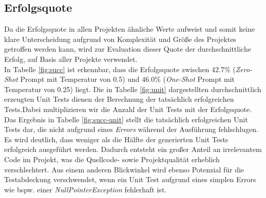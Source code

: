 \subsection{Erfolgsquote}
Da die Erfolgsquote in allen Projekten ähnliche Werte aufweist und somit keine klare Unterscheidung aufgrund von Komplexität und Größe des Projektes getroffen werden kann, wird zur Evaluation dieser Quote der durchschnittliche Erfolg, auf Basis aller Projekte verwendet.\\
In Tabelle \ref{fig:succ} ist erkennbar, dass die Erfolgsquote zwischen 42.7\% (\textit{Zero-Shot} Prompt mit Temperatur von 0.5) und 46.0\% (\textit{One-Shot} Prompt mit Temperatur von 0.25) liegt. Die in Tabelle \ref{fig:unit} dargestellten durchschnittlich erzeugten Unit Tests dienen der Berechnung der tatsächlich erfolgreichen Tests.Dabei multiplizieren wir die Anzahl der Unit Tests mit der Erfolgsquote. Das Ergebnis in Tabelle \ref{fig:succ-unit} stellt die tatsächlich erfolgreichen Unit Tests dar, die nicht aufgrund eines \textit{Errors} während der Ausführung fehlschlugen.  Es wird deutlich, dass weniger als die Hälfte der generierten Unit Tests erfolgreich ausgeführt werden. Dadurch entsteht ein großer Anteil an irrelevantem Code im Projekt, was die Quellcode- sowie Projektqualität erheblich verschlechtert. Aus einem anderen Blickwinkel wird ebenso Potenzial für die Testabdeckung verschwendet, wenn ein Unit Test aufgrund eines simplen Errors wie bspw. einer \textit{NullPointerException} fehlerhaft ist.

